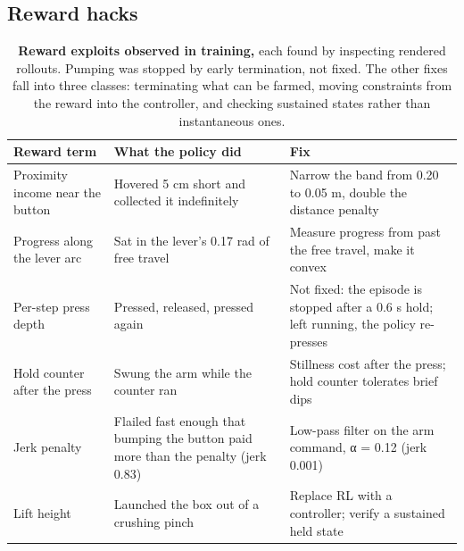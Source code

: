 \documentclass[
  10pt,
  twocolumn]{article}
\begin{document}
\subsection{Reward hacks}\label{reward-hacks}

\begin{table}[t]
\centering\small
\caption{\textbf{Reward exploits observed in training,} each found by
inspecting rendered rollouts. Pumping was stopped by early termination,
not fixed. The other fixes fall into three classes: terminating what can
be farmed, moving constraints from the reward into the controller, and
checking sustained states rather than instantaneous
ones.}
\begin{tabular}{@{}
  >{\raggedright\arraybackslash}p{}
  >{\raggedright\arraybackslash}p{}
  >{\raggedright\arraybackslash}p{}@{}}
\toprule\noalign{}
\begin{minipage}[b]{\linewidth}\raggedright
Reward term
\end{minipage} & \begin{minipage}[b]{\linewidth}\raggedright
What the policy did
\end{minipage} & \begin{minipage}[b]{\linewidth}\raggedright
Fix
\end{minipage} \\
\midrule\noalign{}

Proximity income near the button & Hovered 5 cm short and collected it
indefinitely & Narrow the band from 0.20 to 0.05 m, double the distance
penalty \\
Progress along the lever arc & Sat in the lever's 0.17 rad of free
travel & Measure progress from past the free travel, make it convex \\
Per-step press depth & Pressed, released, pressed again & Not fixed: the
episode is stopped after a 0.6 s hold; left running, the policy
re-presses \\
Hold counter after the press & Swung the arm while the counter ran &
Stillness cost after the press; hold counter tolerates brief dips \\
Jerk penalty & Flailed fast enough that bumping the button paid more
than the penalty (jerk 0.83) & Low-pass filter on the arm command, α =
0.12 (jerk 0.001) \\
Lift height & Launched the box out of a crushing pinch & Replace RL with
a controller; verify a sustained held state \\
\bottomrule
\end{tabular}
\end{table}
\end{document}
